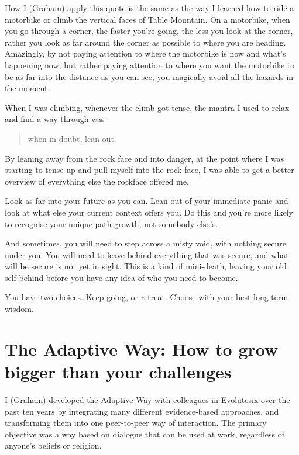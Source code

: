 \begin{longstoryblock}
How I (Graham) apply this quote is the same as the way I learned how to ride a motorbike or climb the vertical faces of Table Mountain. On a motorbike, when you go through a corner, the faster you’re going, the less you look at the corner, rather you look as far around the corner as possible to where you are heading. Amazingly, by not paying attention to where the motorbike is now and what's happening now, but rather paying attention to where you want the motorbike to be as far into the distance as you can see, you magically avoid all the hazards in the moment.


When I was climbing, whenever the climb got tense, the mantra I used to relax and find a way through was \begin{quote} when in doubt, lean out. \end{quote} By leaning away from the rock face and into danger, at the point where I was starting to tense up and pull myself into the rock face, I was able to get a better overview of everything else the rockface offered me.
\end{longstoryblock}


Look as far into your future as you can. Lean out of your immediate panic and look at what else your current context offers you. Do this and you're more likely to recognise your unique path growth, not somebody else's.


And sometimes, you will need to step across a misty void, with nothing secure under you. You will need to leave behind everything that was secure, and what will be secure is not yet in sight. This is a kind of mini-death, leaving your old self behind before you have any idea of who you need to become. 


You have two choices. Keep going, or retreat. Choose with your best long-term wisdom. 




\section{The Adaptive Way: How to grow bigger than your challenges}
I (Graham) developed the Adaptive Way  with colleagues in Evolutesix  over the past ten years by integrating many different evidence-based approaches, and transforming them into one peer-to-peer way of interaction. The primary objective was a way based on dialogue that can be used at work, regardless of anyone’s beliefs or religion. 


